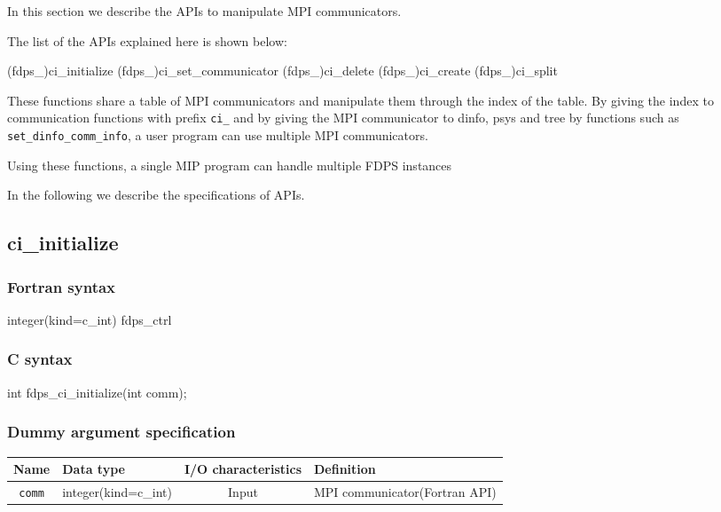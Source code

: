 %
%
%

In this section we describe the APIs to manipulate MPI communicators.

The list of the APIs explained here is shown below:

\begin{screen}
  \begin{spverbatim}
(fdps_)ci_initialize
(fdps_)ci_set_communicator
(fdps_)ci_delete
(fdps_)ci_create
(fdps_)ci_split
\end{spverbatim}
\end{screen}

These functions share a table of MPI communicators and
manipulate them through the index of the table.
By giving the index to communication functions with prefix
{\tt ci\_} and by giving the MPI communicator to dinfo, psys and tree
by functions such as  {\tt   set\_dinfo\_comm\_info}, a user program
can use multiple MPI communicators.

Using these functions, a single MIP program can handle multiple FDPS
instances 

In the following we describe the specifications of APIs. 

\subsection{ci\_initialize}
\subsubsection*{Fortran syntax}
\begin{screen}
\begin{spverbatim}
integer(kind=c_int) fdps_ctrl%
\end{spverbatim}
\end{screen}

\subsubsection*{C syntax}
\begin{screen}
\begin{spverbatim}
int fdps_ci_initialize(int comm);
\end{spverbatim}
\end{screen}

\subsubsection*{Dummy argument specification}
\begin{table}[h]
\begin{tabularx}{\linewidth}{cXcX}
\toprule
\rowcolor{Snow2}
Name & Data type & I/O characteristics & Definition \\
\midrule
\verb|comm| & integer(kind=c\_int) & Input & MPI communicator(Fortran API)\\
\bottomrule
\end{tabularx}
\end{table}



